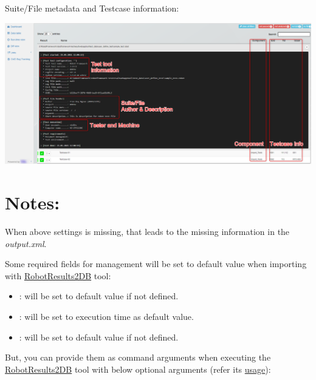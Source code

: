 Suite/File metadata and Testcase information:

\includegraphics[width=1\linewidth]{./pictures/Datatable.png}

\hypertarget{description-notes}{%
\section{Notes:}\label{description-notes}}

When above settings is missing, that leads to the missing information in
the \emph{output.xml}.

Some required fields for management will be set to default value when
importing with
\href{https://github.com/test-fullautomation/robotframework-testresultwebapptool}{RobotResults2DB}
tool:

\begin{itemize}
\tightlist
\item
  : will be set to default value  if not defined.
\item
  : will be set to execution time
   as default value.
\item
  : will be set to default value  if not
  defined.
\end{itemize}

But, you can provide them as command arguments when executing the
\href{https://github.com/test-fullautomation/robotframework-testresultwebapptool}{RobotResults2DB}
tool with below optional arguments (refer its
\href{https://github.com/test-fullautomation/robotframework-testresultwebapptool\#usage}{usage}):

